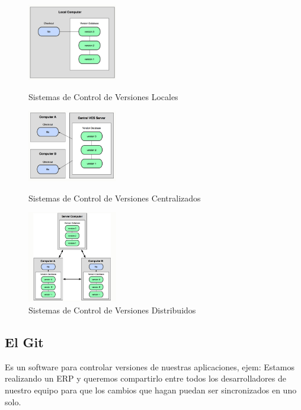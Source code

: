 \documentclass[12pt]{article}
\begin{document}
\begin{figure}
\begin{center}
  \includegraphics[width=0.35\textwidth]{imagenes/grafico1.png}
\caption{Sistemas de Control de Versiones Locales}

  \includegraphics[width=0.35\textwidth]{imagenes/grafico2.png}
\caption{Sistemas de Control de Versiones Centralizados}

  \includegraphics[width=0.35\textwidth]{imagenes/grafico3.png}
\caption{Sistemas de Control de Versiones Distribuidos}
\end{center}
\end{figure}

\newpage
\subsection{El Git}
Es un software para controlar versiones de nuestras aplicaciones, ejem: Estamos realizando un ERP y queremos compartirlo entre todos los desarrolladores de nuestro equipo para que los cambios que hagan puedan ser sincronizados en uno solo.
\end{document}

